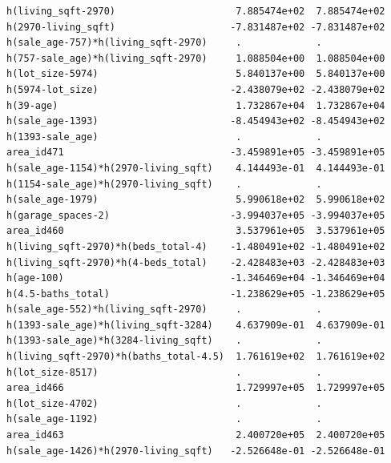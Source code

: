 \documentclass[
]{article}
\begin{document}
\begin{verbatim}
h(living_sqft-2970)                     7.885474e+02  7.885474e+02
h(2970-living_sqft)                    -7.831487e+02 -7.831487e+02
h(sale_age-757)*h(living_sqft-2970)     .             .           
h(757-sale_age)*h(living_sqft-2970)     1.088504e+00  1.088504e+00
h(lot_size-5974)                        5.840137e+00  5.840137e+00
h(5974-lot_size)                       -2.438079e+02 -2.438079e+02
h(39-age)                               1.732867e+04  1.732867e+04
h(sale_age-1393)                       -8.454943e+02 -8.454943e+02
h(1393-sale_age)                        .             .           
area_id471                             -3.459891e+05 -3.459891e+05
h(sale_age-1154)*h(2970-living_sqft)    4.144493e-01  4.144493e-01
h(1154-sale_age)*h(2970-living_sqft)    .             .           
h(sale_age-1979)                        5.990618e+02  5.990618e+02
h(garage_spaces-2)                     -3.994037e+05 -3.994037e+05
area_id460                              3.537961e+05  3.537961e+05
h(living_sqft-2970)*h(beds_total-4)    -1.480491e+02 -1.480491e+02
h(living_sqft-2970)*h(4-beds_total)    -2.428483e+03 -2.428483e+03
h(age-100)                             -1.346469e+04 -1.346469e+04
h(4.5-baths_total)                     -1.238629e+05 -1.238629e+05
h(sale_age-552)*h(living_sqft-2970)     .             .           
h(1393-sale_age)*h(living_sqft-3284)    4.637909e-01  4.637909e-01
h(1393-sale_age)*h(3284-living_sqft)    .             .           
h(living_sqft-2970)*h(baths_total-4.5)  1.761619e+02  1.761619e+02
h(lot_size-8517)                        .             .           
area_id466                              1.729997e+05  1.729997e+05
h(lot_size-4702)                        .             .           
h(sale_age-1192)                        .             .           
area_id463                              2.400720e+05  2.400720e+05
h(sale_age-1426)*h(2970-living_sqft)   -2.526648e-01 -2.526648e-01
                                                                  

\end{verbatim}
\end{document}
